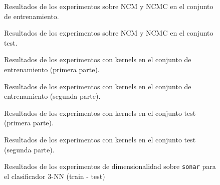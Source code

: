 \begin{figure}[h]
\resizebox{\textwidth}{!}{%
    
}
\caption{Resultados de los experimentos sobre NCM y NCMC en el conjunto de entrenamiento.} \label{results:ncm:train}
\end{figure}

\begin{figure}[h]
\resizebox{\textwidth}{!}{%
    
}
\caption{Resultados de los experimentos sobre NCM y NCMC en el conjunto test.} \label{results:ncm:test}
\end{figure}

\begin{figure}[h]
\makebox[\textwidth][c]{%
\resizebox{1.2\textwidth}{!}{%
    
}%
}
\caption{Resultados de los experimentos con kernels en el conjunto de entrenamiento (primera parte).} \label{results:ker:3nn:train:1}
\end{figure}

\begin{figure}[h]
\makebox[\textwidth][c]{%
\resizebox{1.2\textwidth}{!}{%
    
}%
}
\caption{Resultados de los experimentos con kernels en el conjunto de entrenamiento (segunda parte).} \label{results:ker:3nn:train:2}
\end{figure}


\begin{figure}[h]
\makebox[\textwidth][c]{%
\resizebox{1.2\textwidth}{!}{%
    
}%
}
\caption{Resultados de los experimentos con kernels en el conjunto test (primera parte).} \label{results:ker:3nn:test:1}
\end{figure}

\begin{figure}[h]
\makebox[\textwidth][c]{%
\resizebox{1.2\textwidth}{!}{%
    
}%
}
\caption{Resultados de los experimentos con kernels en el conjunto test (segunda parte).} \label{results:ker:3nn:test:2}
\end{figure}

\begin{figure}[h]
\caption{Resultados de los experimentos de dimensionalidad sobre \texttt{sonar} para el clasificador 3-NN (train - test)} \label{results:dim:sonar:3nn}
\end{figure}

